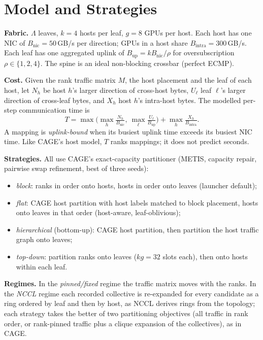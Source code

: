 \documentclass[conference]{IEEEtran}
\begin{document}
\section{Model and Strategies}\label{sec:model}

\textbf{Fabric.} $\Lambda$ leaves, $k=4$ hosts per leaf, $g=8$ GPUs per host. Each host has one NIC
of $B_{\mathrm{nic}}=50$\,GB/s per direction; GPUs in a host share $B_{\mathrm{intra}}=300$\,GB/s.
Each leaf has one aggregated uplink of $B_{\mathrm{up}} = kB_{\mathrm{nic}}/\rho$ for
oversubscription $\rho\in\{1,2,4\}$. The spine is an ideal non-blocking crossbar (perfect ECMP).

\textbf{Cost.} Given the rank traffic matrix $M$, the host placement and the leaf of each host,
let $N_h$ be host $h$'s larger direction of cross-host bytes, $U_\ell$ leaf $\ell$'s larger direction
of cross-leaf bytes, and $X_h$ host $h$'s intra-host bytes. The modelled per-step communication time is
\begin{equation}
T = \max\Big(\max_h \tfrac{N_h}{B_{\mathrm{nic}}},\ \max_\ell \tfrac{U_\ell}{B_{\mathrm{up}}}\Big)
    + \max_h \tfrac{X_h}{B_{\mathrm{intra}}}.
\end{equation}
A mapping is \emph{uplink-bound} when its busiest uplink time exceeds its busiest NIC time. Like
CAGE's host model, $T$ ranks mappings; it does not predict seconds.

\textbf{Strategies.} All use CAGE's exact-capacity partitioner (METIS, capacity repair, pairwise
swap refinement, best of three seeds):
\begin{itemize}
\item \emph{block}: ranks in order onto hosts, hosts in order onto leaves (launcher default);
\item \emph{flat}: CAGE host partition with host labels matched to block placement, hosts onto
      leaves in that order (host-aware, leaf-oblivious);
\item \emph{hierarchical} (bottom-up): CAGE host partition, then partition the host traffic graph
      onto leaves;
\item \emph{top-down}: partition ranks onto leaves ($kg=32$ slots each), then onto hosts within each leaf.
\end{itemize}

\textbf{Regimes.} In the \emph{pinned/fixed} regime the traffic matrix moves with the ranks.
In the \emph{NCCL} regime each recorded collective is re-expanded for every candidate as a ring
ordered by leaf and then by host, as NCCL derives rings from the topology; each strategy takes the
better of two partitioning objectives (all traffic in rank order, or rank-pinned traffic plus a
clique expansion of the collectives), as in CAGE.
\end{document}

